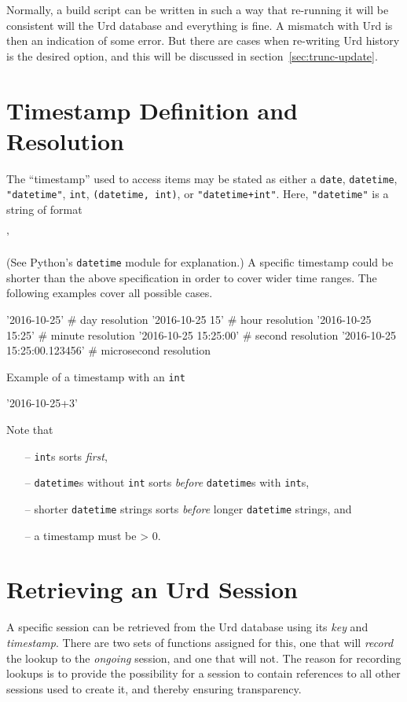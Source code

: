 Normally, a build script can be written in such a way that re-running
it will be consistent will the Urd database and everything is fine.  A
mismatch with Urd is then an indication of some error.  But there are
cases when re-writing Urd history is the desired option, and this will
be discussed in section~\ref{sec:trunc-update}.





\section{Timestamp Definition and Resolution}
The ``timestamp'' used to access items may be stated as either
a \texttt{date}, \texttt{datetime}, \texttt{"datetime"}, \texttt{int}, \texttt{(datetime,
int)}, or \texttt{"datetime+int"}.  Here, \texttt{"datetime"} is a
string of format
\begin{shell}
'%
\end{shell}
(See Python's \texttt{datetime} module for explanation.)  A specific
timestamp could be shorter than the above specification in order to
cover wider time ranges.  The following examples cover all possible
cases.
\begin{python}
'2016-10-25'                 # day resolution
'2016-10-25 15'              # hour resolution
'2016-10-25 15:25'           # minute resolution
'2016-10-25 15:25:00'        # second resolution
'2016-10-25 15:25:00.123456' # microsecond resolution
\end{python}
Example of a timestamp with an \texttt{int}
\begin{python}
'2016-10-25+3'
\end{python}
Note that
\begin{itemize}
  \item[--] \texttt{int}s sorts \textsl{first}, 
  \item[--] \texttt{datetime}s without \texttt{int} sorts \textsl{before} \texttt{datetime}s with \texttt{int}s, 
  \item[--] shorter \texttt{datetime} strings sorts \textsl{before} longer \texttt{datetime} strings, and
  \item[--] a timestamp must be > 0.
\end{itemize}





\section{Retrieving an Urd Session}
A specific session can be retrieved from the Urd database using its
\textsl{key} and \textsl{timestamp}.  There are two sets of functions
assigned for this, one that will \textsl{record} the lookup to
the \textsl{ongoing} session, and one that will not.  The reason for
recording lookups is to provide the possibility for a session to
contain references to all other sessions used to create it, and
thereby ensuring transparency.


